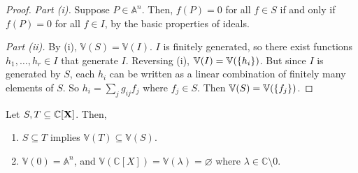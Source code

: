 \begin{proof}
    \emph{Part (i).}
    Suppose \( P \in \mathbb A^n \).
    Then, \( f(P) = 0 \) for all \( f \in S \) if and only if \( f(P) = 0 \) for all \( f \in I \), by the basic properties of ideals.

    \emph{Part (ii).}
    By (i), \( \mathbb V(S) = \mathbb V(I) \).
    \( I \) is finitely generated, so there exist functions \( h_1, \dots, h_r \in I \) that generate \( I \).
    Reversing (i), \( \mathbb V(I) = \mathbb V(\qty{h_i}) \).
    But since \( I \) is generated by \( S \), each \( h_i \) can be written as a linear combination of finitely many elements of \( S \).
    So \( h_i = \sum_j g_{ij} f_j \) where \( f_j \in S \).
    Then \( \mathbb V(S) = \mathbb V(\qty{f_j}) \).
\end{proof}
\begin{proposition}
    Let \( S, T \subseteq \mathbb C[\vb X] \).
    Then,
    \begin{enumerate}
        \item \( S \subseteq T \) implies \( \mathbb V(T) \subseteq \mathbb V(S) \).
        \item \( \mathbb V(0) = \mathbb A^n \), and \( \mathbb V(\mathbb C[X]) = \mathbb V(\lambda) = \varnothing \) where \( \lambda \in \mathbb C \setminus \qty{0} \).
    \end{enumerate}
\end{proposition}

